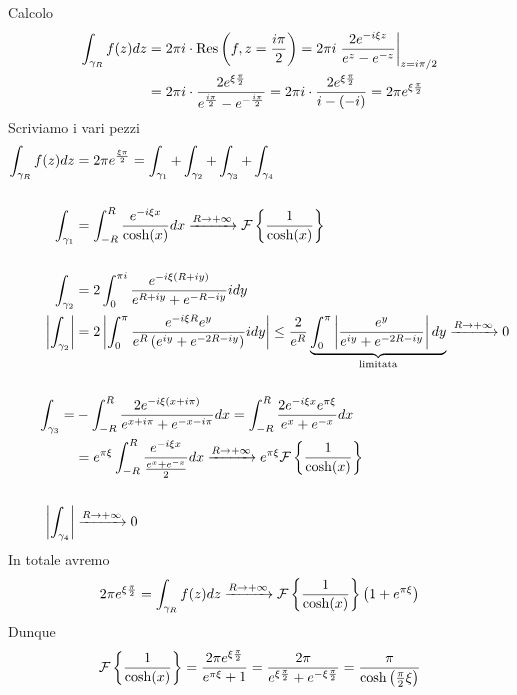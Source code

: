 Calcolo
\begin{equation*}
\begin{aligned}
\int _{\gamma _{R}} f(z)dz & = 2\pi i\cdot \operatorname{Res} \left(f,z = \frac{i\pi }{2}\right) = 2\pi i\left. \frac{2e^{ - i\xi z}}{e^{z} - e^{ - z}}\right| _{z = i\pi /2}\\
 & = 2\pi i\cdot \frac{2e^{\xi \frac{\pi }{2}}}{e^{\frac{i\pi }{2}} - e^{ - \frac{i\pi }{2}}} = 2\pi i\cdot \frac{2e^{\xi \frac{\pi }{2}}}{i - (- i)} = 2\pi e^{\xi \frac{\pi }{2}}
\end{aligned}
\end{equation*}
Scriviamo i vari pezzi
\begin{align*}
\int _{\gamma _{R}} f(z) dz & = 2\pi e^{\frac{\xi \pi }{2}} = \int _{\gamma _{1}} + \int _{\gamma _{2}} + \int _{\gamma _{3}} + \int _{\gamma _{4}}\\
 & \\
\int _{\gamma _{1}} & = \int ^{R}_{ - R}\frac{e^{ - i\xi x}}{\cosh (x)} dx\xrightarrow{R\rightarrow + \infty }\mathcal{F} \left\{\frac{1}{\cosh (x)}\right\}\\
 & \\
\int _{\gamma _{2}} & = 2\int ^{\pi i}_{0}\frac{e^{ - i\xi (R + iy)}}{e^{R + iy} + e^{ - R - iy}} idy\\
\left| \int _{\gamma _{2}}\right|  & = 2\left| \int ^{\pi }_{0}\frac{e^{ - i\xi R} e^{y}}{e^{R}\left(e^{iy} + e^{ - 2R - iy}\right)} idy\right| \leq \frac{2}{e^{R}}\underbrace{\int ^{\pi }_{0}\left| \frac{e^{y}}{e^{iy} + e^{ - 2R - iy}}\right| dy}_{\text{limitata}}\xrightarrow{R\rightarrow + \infty } 0\\
 & \\
\int _{\gamma _{3}} = & - \int ^{R}_{ - R}\frac{2e^{ - i\xi (x + i\pi)}}{e^{x + i\pi } + e^{ - x - i\pi }} dx = \int ^{R}_{ - R}\frac{2e^{ - i\xi x} e^{\pi \xi }}{e^{x} + e^{ - x}} dx\\
 & = e^{\pi \xi }\int ^{R}_{ - R}\frac{e^{ - i\xi x}}{\frac{e^{x} + e^{ - x}}{2}} dx\xrightarrow{R\rightarrow + \infty } e^{\pi \xi }\mathcal{F} \left\{\frac{1}{\cosh (x)}\right\}\\
 & \\
\left| \int _{\gamma _{4}}\right|  & \xrightarrow{R\rightarrow + \infty } 0
\end{align*}
In totale avremo
\begin{equation*}
2\pi e^{\xi \frac{\pi }{2}} = \int _{\gamma _{R}} f(z) dz\xrightarrow{R\rightarrow + \infty }\mathcal{F} \left\{\frac{1}{\cosh (x)}\right\}\left(1 + e^{\pi \xi }\right)
\end{equation*}
Dunque
\begin{equation*}
\mathcal{F} \left\{\frac{1}{\cosh (x)}\right\} = \frac{2\pi e^{\xi \frac{\pi }{2}}}{e^{\pi \xi } + 1} = \frac{2\pi }{e^{\xi \frac{\pi }{2}} + e^{ - \xi \frac{\pi }{2}}} = \frac{\pi }{\cosh\left(\frac{\pi }{2} \xi \right)}
\end{equation*}
\Soluzione

